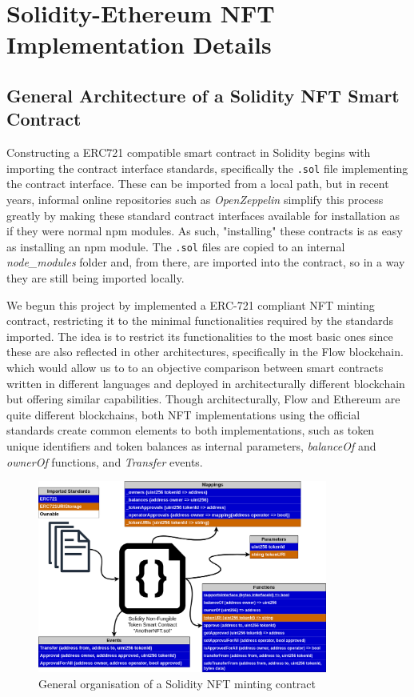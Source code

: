 \documentclass[../main.tex]{subfiles}
\begin{document}
\section{Solidity-Ethereum NFT Implementation Details}
\label{sec:solidity_ethereum_nft_implementation}
\subsection{General Architecture of a Solidity NFT Smart Contract}
Constructing a ERC721 compatible smart contract in Solidity begins with importing the contract interface standards, specifically the \verb|.sol| file implementing the contract interface. These can be imported from a local path, but in recent years, informal online repositories such as \textit{OpenZeppelin} \cite{OpenZeppelin2024} simplify this process greatly by making these standard contract interfaces available for installation as if they were normal npm modules. As such, "installing" these contracts is as easy as installing an npm module. The \verb|.sol| files are copied to an internal \textit{node\_modules} folder and, from there, are imported into the contract, so in a way they are still being imported locally.
\par
We begun this project by implemented a ERC-721 compliant NFT minting contract, restricting it to the minimal functionalities required by the standards imported. The idea is to restrict its functionalities to the most basic ones since these are also reflected in other architectures, specifically in the Flow blockchain. which would allow us to to an objective comparison between smart contracts written in different languages and deployed in architecturally different blockchain but offering similar capabilities. Though architecturally, Flow and Ethereum are quite different blockchains, both NFT implementations using the official standards create common elements to both implementations, such as token unique identifiers and token balances as internal parameters, \textit{balanceOf} and \textit{ownerOf} functions, and \textit{Transfer} events.

\begin{figure}[htp]
    \centering
    \includegraphics[width=0.85\textwidth]{../Images/04_Solidity_NFT_Contract_Arch.png}
    \caption{General organisation of a Solidity NFT minting contract}
    \label{fig:solidity_contract_architecture}
\end{figure}
\end{document}
